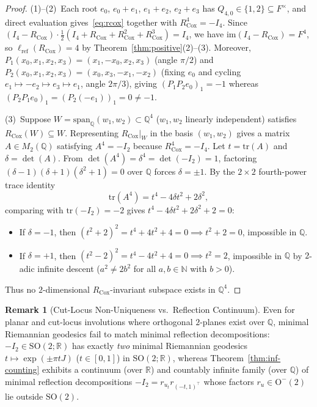\documentclass[11pt,a4paper]{article}
\theoremstyle{plain}
\theoremstyle{definition}
\newtheorem{remark}[theorem]{Remark}
\newcommand{\R}{\mathbb{R}}
\newcommand{\Q}{\mathbb{Q}}
\newcommand{\N}{\mathbb{N}}
\newcommand{\Orth}{\mathrm{O}}
\newcommand{\SO}{\mathrm{SO}}
\newcommand{\lref}{\ell_{\mathrm{ref}}}
\newcommand{\tr}{\mathrm{tr}}
\newcommand{\im}{\mathrm{im}}
\newcommand{\spn}{\mathrm{span}}
\begin{document}
\begin{proof}
(1)--(2)~Each root $e_0$, $e_0 + e_1$, $e_1 + e_2$, $e_2 + e_3$ has $Q_{4,0} \in \{1, 2\} \subseteq F^\times$, and direct evaluation gives~\eqref{eq:rcox} together with $R_{\mathrm{Cox}}^4 = -I_4$. Since $(I_4 - R_{\mathrm{Cox}}) \cdot \frac{1}{2}(I_4 + R_{\mathrm{Cox}} + R_{\mathrm{Cox}}^2 + R_{\mathrm{Cox}}^3) = I_4$, we have $\im(I_4 - R_{\mathrm{Cox}}) = F^4$, so $\lref(R_{\mathrm{Cox}}) = 4$ by Theorem~\ref{thm:positive}(2)--(3). Moreover, $P_1(x_0, x_1, x_2, x_3) = (x_1, -x_0, x_2, x_3)$ (angle $\pi/2$) and $P_2(x_0, x_1, x_2, x_3) = (x_0, x_3, -x_1, -x_2)$ (fixing $e_0$ and cycling $e_1 \mapsto -e_2 \mapsto e_3 \mapsto e_1$, angle $2\pi/3$), giving $(P_1 P_2 e_0)_1 = -1$ whereas $(P_2 P_1 e_0)_1 = (P_2(-e_1))_1 = 0 \neq -1$.

(3)~Suppose $W = \spn_\Q(w_1, w_2) \subset \Q^4$ ($w_1, w_2$ linearly independent) satisfies $R_{\mathrm{Cox}}(W) \subseteq W$. Representing $R_{\mathrm{Cox}}|_W$ in the basis $(w_1, w_2)$ gives a matrix $A \in M_2(\Q)$ satisfying $A^4 = -I_2$ because $R_{\mathrm{Cox}}^4 = -I_4$. Let $t = \tr(A)$ and $\delta = \det(A)$. From $\det(A^4) = \delta^4 = \det(-I_2) = 1$, factoring $(\delta - 1)(\delta + 1)(\delta^2 + 1) = 0$ over $\Q$ forces $\delta = \pm 1$. By the $2 \times 2$ fourth-power trace identity
\[
  \tr(A^4) = t^4 - 4 \delta t^2 + 2 \delta^2,
\]
comparing with $\tr(-I_2) = -2$ gives $t^4 - 4\delta t^2 + 2\delta^2 + 2 = 0$:
\begin{itemize}
\item If $\delta = -1$, then $(t^2 + 2)^2 = t^4 + 4 t^2 + 4 = 0 \implies t^2 + 2 = 0$, impossible in $\Q$.
\item If $\delta = +1$, then $(t^2 - 2)^2 = t^4 - 4 t^2 + 4 = 0 \implies t^2 = 2$, impossible in $\Q$ by $2$-adic infinite descent ($a^2 \neq 2 b^2$ for all $a, b \in \N$ with $b > 0$).
\end{itemize}
Thus no $2$-dimensional $R_{\mathrm{Cox}}$-invariant subspace exists in $\Q^4$.
\end{proof}

\begin{remark}[Cut-Locus Non-Uniqueness vs.\ Reflection Continuum]
Even for planar and cut-locus involutions where orthogonal $2$-planes exist over $\Q$, minimal Riemannian geodesics fail to match minimal reflection decompositions: $-I_2 \in \SO(2; \R)$ has exactly \emph{two} minimal Riemannian geodesics $t \mapsto \exp(\pm \pi t J)$ ($t \in [0, 1]$) in $\SO(2; \R)$, whereas Theorem~\ref{thm:inf-counting} exhibits a continuum (over $\R$) and countably infinite family (over $\Q$) of minimal reflection decompositions $-I_2 = r_{u_t} r_{(-t, 1)^\top}$ whose factors $r_u \in \Orth^-(2)$ lie outside $\SO(2)$.
\end{remark}
\end{document}
